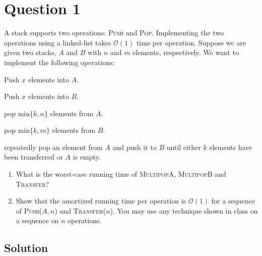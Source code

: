 
\section*{Question 1}

A stack supports two operations: \textsc{Push} and \textsc{Pop}.
Implementing the two operations using a linked-list takes $\mathcal{O}(1)$ time per operation.
Suppose we are given two stacks, $A$ and $B$ with $n$ and $m$ elements, respectively.
We want to implement the following operations:
\begin{description}\itemsep=0pt
\item[\textsc{Push}($A, x$)] Push $x$ elements into $A$.
\item[\textsc{Push}($B, x$)] Push $x$ elements into $B$.
\item[\textsc{MultipopA($k$)}] pop $\text{min}\{k,n\}$ elements from $A$.
\item[\textsc{MultipopB($k$)}] pop $\text{min}\{k,m\}$ elements from $B$.
\item[\textsc{Transfer($k$)}] repeatedly pop an element from $A$ and push it to $B$ until either $k$ elements have been transferred or $A$ is empty.
\end{description}
\begin{enumerate}[label=(\alph*)]
\item What is the worst-case running time of \textsc{MultipopA}, \textsc{MultipopB} and \textsc{Transfer}?
\item Show that the amortized running time per operation is $\mathcal{O}(1)$ for a sequence of \textsc{Push}($A,n$) and \textsc{Transfer}($n$).
You may use any technique shown in class on a sequence on $n$ operations.
\end{enumerate}

\subsection*{Solution}

